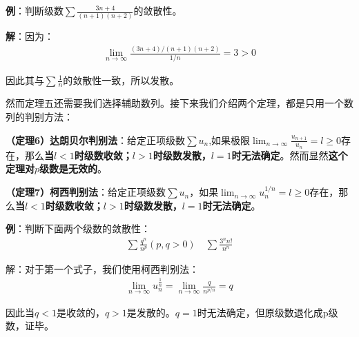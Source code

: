 \documentclass{ctexart}
\let\oldtextbf\textbf
\renewcommand{\textbf}[1]{\textcolor{brown!50!red}{\oldtextbf{#1}}}
\begin{document}
\textbf{\color{brown!50!red}例}：判断级数$\sum \frac{3n+4}{(n+1)(n+2)}$的敛散性。

\textbf{\color{brown!50!red}解}：因为：
\begin{align*}
   \lim_{n\to\infty}\frac{(3n+4)/(n+1)(n+2)}{1/n} =3>0
\end{align*}

因此其与$\sum \frac{1}{n}$的敛散性一致，所以发散。

然而定理五还需要我们选择辅助数列。接下来我们介绍两个定理，都是只用一个数列的判别方法：

\begin{tcolorbox}[
    colback=bac2,     %
    colframe=fra2,   %
    coltitle=white,             %
    coltext=tex2,
    title=达朗贝尔判别法,
    fonttitle=\bfseries,        %
arc=3mm,                     %
breakable
]
\textbf{\color{brown!50!red}（定理6）达朗贝尔判别法}：给定正项级数$\sum u_n$,如果极限$\lim_{n\to\infty}\frac{u_{n+1}}{u_n}=l\geq 0$存在，那么\textbf{\color{brown!50!red}当$l<1$时级数收敛；$l>1$时级数发散，$l=1$时无法确定}。然而显然\textbf{\color{brown!50!red}这个定理对$p$级数是无效的}。
\end{tcolorbox}


\begin{tcolorbox}[
    colback=bac2,     %
    colframe=fra2,   %
    coltitle=white,             %
    coltext=tex2,
    title=柯西判别法,
    fonttitle=\bfseries,        %
arc=3mm,                     %
breakable
]
\textbf{\color{brown!50!red}（定理7）柯西判别法}：给定正项级数$\sum u_n$，如果$\lim_{n\to\infty}u_n^{1/n}=l\geq 0$存在，那么\textbf{\color{brown!50!red}当$l<1$时级数收敛；$l>1$时级数发散，$l=1$时无法确定}。
\end{tcolorbox}



\textbf{\color{brown!50!red}例}：判断下面两个级数的敛散性：
\begin{align*}
    \sum\frac{q^n}{n^p}(p,q>0)\quad \sum\frac{3^nn!}{n^n}
\end{align*}

解：对于第一个式子，我们使用柯西判别法：
\begin{align*}
   \lim_{n\to\infty}u_n^{\frac{1}{n}}=\lim_{n\to\infty}\frac{q}{n^{p/n}}=q 
\end{align*}

因此当$q<1$是收敛的，$q>1$是发散的。$q=1$时无法确定，但原级数退化成p级数，证毕。
\end{document}
